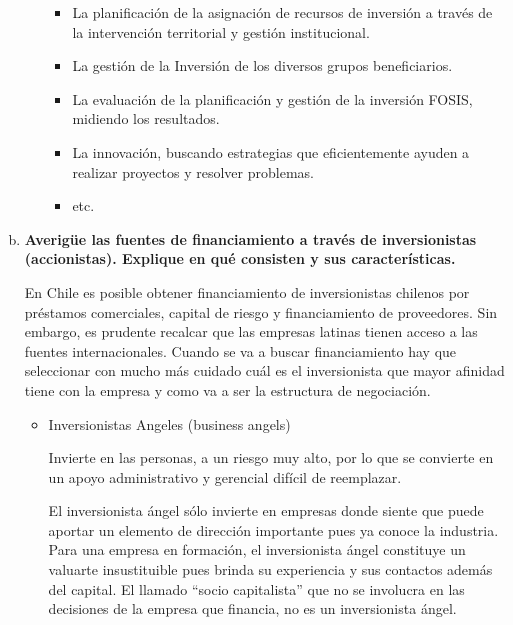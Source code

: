 \begin{enumerate}[(a)]
\begin{itemize}
                    \begin{itemize}
                        \item La planificación de la asignación de recursos de inversión a través de la intervención territorial y gestión institucional.
                        \item La gestión de la Inversión de los diversos grupos beneficiarios.
                        \item La evaluación de la planificación y gestión de la inversión FOSIS, midiendo los resultados.
                        \item La innovación, buscando estrategias que eficientemente ayuden a realizar proyectos y resolver problemas.
                        \item etc.
                    \end{itemize}
        \end{itemize}


 
    \item {\bf Averigüe las fuentes de financiamiento a través de inversionistas (accionistas).
          Explique en qué consisten y sus características.}\\


            En Chile es posible obtener financiamiento de inversionistas chilenos por préstamos comerciales, capital de riesgo y 
            financiamiento de proveedores. Sin embargo, es prudente recalcar que las empresas latinas tienen acceso a las fuentes 
            internacionales. Cuando se va a buscar financiamiento hay que seleccionar con mucho más cuidado cuál es el inversionista 
            que mayor afinidad tiene con la empresa y como va a ser la estructura de negociación.
           
            \begin{itemize}
                \item Inversionistas Angeles (business angels)
            
                    Invierte en las personas, a un riesgo muy alto, por lo que se convierte en un apoyo administrativo y gerencial difícil de reemplazar.

                    El inversionista ángel sólo invierte en empresas donde siente que puede aportar un elemento de dirección importante pues ya 
                    conoce la industria. Para una empresa en formación, el inversionista ángel constituye un valuarte insustituible pues brinda su 
                    experiencia y sus contactos además del capital. El llamado ``socio capitalista'' que no se involucra en las decisiones de la empresa 
                    que financia, no es un inversionista ángel.
            

\end{itemize}
\end{enumerate}

